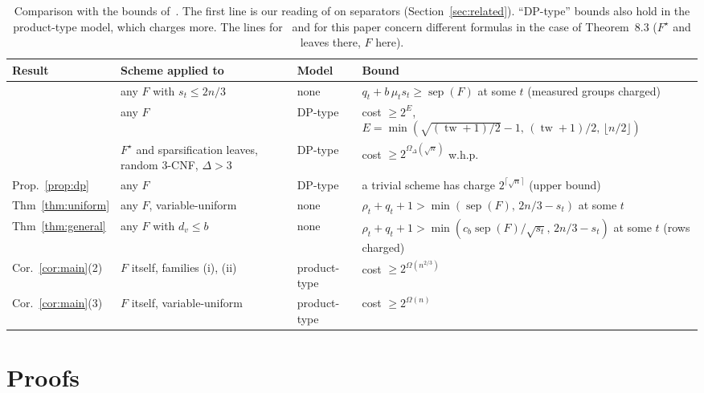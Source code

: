 \documentclass[11pt,a4paper]{article}
\theoremstyle{definition}
\theoremstyle{remark}
\newcommand{\sep}{\operatorname{sep}}
\newcommand{\tw}{\operatorname{tw}}
\begin{document}
\begin{table}[t]
\centering
\small
\begin{tabular}{@{}>{\raggedright\arraybackslash}p{2.5cm}>{\raggedright\arraybackslash}p{3.7cm}>{\raggedright\arraybackslash}p{2.1cm}>{\raggedright\arraybackslash}p{6.2cm}@{}}
\toprule
Result & Scheme applied to & Model & Bound\\
\midrule
\cite[Thm~7.1(ii)]{DL} & any $F$ with $s_t\le 2n/3$ & none & $q_t+b\,\mu_ts_t\ge\sep(F)$ at some $t$ \newline(measured groups charged)\\[2pt]
\cite[Thm~8.1]{DL} & any $F$ & DP-type & cost $\ge2^{E}$, \newline $E=\min(\sqrt{(\tw+1)/2}-1,\,(\tw+1)/2,\,\lfloor n/2\rfloor)$\\[2pt]
\cite[Thm~8.3]{DL} & $F^\star$ and sparsification leaves, random 3-CNF, $\Delta>3$ & DP-type & cost $\ge2^{\Omega_\Delta(\sqrt n)}$ w.h.p.\\[2pt]
Prop.~\ref{prop:dp} & any $F$ & DP-type & a trivial scheme has charge $2^{\lceil\sqrt n\rceil}$ (upper bound)\\[2pt]
Thm~\ref{thm:uniform} & any $F$, variable-uniform & none & $\rho_t+q_t+1>\min(\sep(F),\,2n/3-s_t)$ \newline at some $t$\\[2pt]
Thm~\ref{thm:general} & any $F$ with $d_v\le b$ & none & $\rho_t+q_t+1>\min(c_b\sep(F)/\sqrt{s_t},\,2n/3-s_t)$ \newline at some $t$ (rows charged)\\[2pt]
Cor.~\ref{cor:main}(2) & $F$ itself, families (i), (ii) & product-type & cost $\ge2^{\Omega(n^{2/3})}$\\[2pt]
Cor.~\ref{cor:main}(3) & $F$ itself, variable-uniform & product-type & cost $\ge2^{\Omega(n)}$\\
\bottomrule
\end{tabular}
\caption{Comparison with the bounds of~\cite{DL}. The first line is our reading of
\cite[Thm~7.1(ii)]{DL} on separators (Section~\ref{sec:related}). ``DP-type'' bounds also hold
in the product-type model, which charges more. The lines for~\cite{DL} and for this paper
concern different formulas in the case of Theorem~8.3 ($F^\star$ and leaves there, $F$
here).}\label{tab:compare}
\end{table}

\section{Proofs}\label{sec:proofs}
\end{document}
